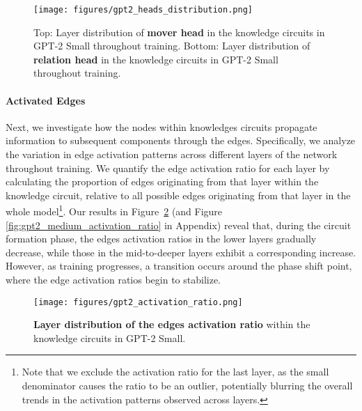 \begin{figure}
    \centering
    \texttt{[image: figures/gpt2\_heads\_distribution.png]}
    \caption{Top: Layer distribution of \textbf{mover head} in the knowledge circuits in GPT-2 Small throughout training. Bottom: Layer distribution of \textbf{relation head} in the knowledge circuits in GPT-2 Small throughout training.}
    \label{fig:gpt2_heads_distribution}
    \vspace{-10pt}
\end{figure}

\paragraph{Activated Edges}

Next, we investigate how the nodes within knowledges circuits propagate information to subsequent components through the edges.
Specifically, we analyze the variation in edge activation patterns across different layers of the network throughout training.
We quantify the edge activation ratio for each layer by calculating the proportion of edges originating from that layer within the knowledge circuit, relative to all possible edges originating from that layer in the whole model\footnote{Note that we exclude the activation ratio for the last layer, as the small denominator causes the ratio to be an outlier, potentially blurring the overall trends in the activation patterns observed across layers.}.
Our results in Figure~\ref{fig:gpt2_activation_ratio} (and Figure \ref{fig:gpt2_medium_activation_ratio} in Appendix) reveal that, during the circuit formation phase, the edges activation ratios in the lower layers gradually decrease, while those in the mid-to-deeper layers exhibit a corresponding increase.
However, as training progresses, a transition occurs around the phase shift point, where the edge activation ratios begin to stabilize.

\begin{figure}
    \centering
    \texttt{[image: figures/gpt2\_activation\_ratio.png]}
    \caption{\textbf{Layer distribution of the edges activation ratio} within the knowledge circuits in GPT-2 Small.}
    \label{fig:gpt2_activation_ratio}
    \vspace{-10pt}
\end{figure}

